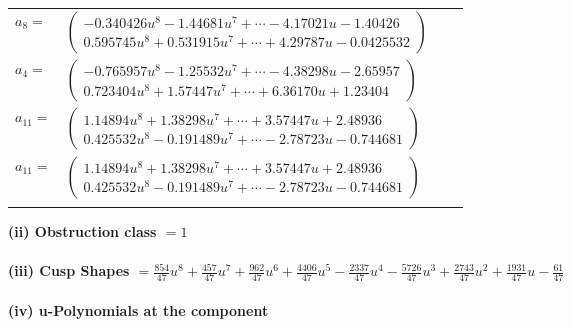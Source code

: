 \documentclass[1p]{elsarticle_modified}
\theoremstyle{definition}
\begin{document}
\begin{tabular}{m{7pt} m{180pt} m{7pt} m{180pt} }
\flushright $a_{8}=$&$\begin{pmatrix}-0.340426 u^{8}-1.44681 u^{7}+\cdots-4.17021 u-1.40426\\0.595745 u^{8}+0.531915 u^{7}+\cdots+4.29787 u-0.0425532\end{pmatrix}$ \\
\flushright $a_{4}=$&$\begin{pmatrix}-0.765957 u^{8}-1.25532 u^{7}+\cdots-4.38298 u-2.65957\\0.723404 u^{8}+1.57447 u^{7}+\cdots+6.36170 u+1.23404\end{pmatrix}$ \\
\flushright $a_{11}=$&$\begin{pmatrix}1.14894 u^{8}+1.38298 u^{7}+\cdots+3.57447 u+2.48936\\0.425532 u^{8}-0.191489 u^{7}+\cdots-2.78723 u-0.744681\end{pmatrix}$\\ \flushright $a_{11}=$&$\begin{pmatrix}1.14894 u^{8}+1.38298 u^{7}+\cdots+3.57447 u+2.48936\\0.425532 u^{8}-0.191489 u^{7}+\cdots-2.78723 u-0.744681\end{pmatrix}$\\&\end{tabular}
\flushleft \textbf{(ii) Obstruction class $= 1$}\\~\\
\flushleft \textbf{(iii) Cusp Shapes $= \frac{854}{47} u^8+\frac{457}{47} u^7+\frac{962}{47} u^6+\frac{4406}{47} u^5-\frac{2337}{47} u^4-\frac{5726}{47} u^3+\frac{2743}{47} u^2+\frac{1931}{47} u-\frac{61}{47}$}\\~\\
\newpage\renewcommand{\arraystretch}{1}
\flushleft \textbf{(iv) u-Polynomials at the component}\newline \\
\end{document}

